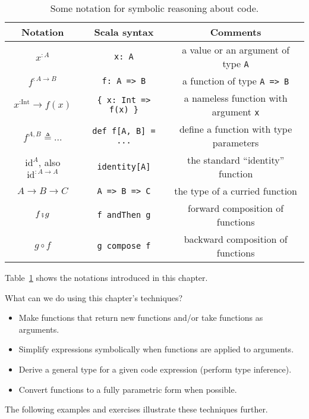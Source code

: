 \begin{table}
\begin{centering}
\begin{tabular}{|c|c|c|}
\hline 
\textbf{\small{}Notation} & \textbf{\small{}Scala syntax} & \textbf{\small{}Comments}\tabularnewline
\hline 
\hline 
{\small{}$x^{:A}$} & {\small{}}\lstinline!x: A! & {\small{}a value or an argument of type }\lstinline!A!\tabularnewline
\hline 
{\small{}$f^{:A\rightarrow B}$} & {\small{}}\lstinline!f: A => B! & {\small{}a function of type }\lstinline!A => B!\tabularnewline
\hline 
{\small{}$x^{:\text{Int}}\rightarrow f(x)$} & {\small{}}\lstinline!{ x: Int => f(x) }! & {\small{}a nameless function with argument }\lstinline!x!\tabularnewline
\hline 
{\small{}$f^{A,B}\triangleq...$} & {\small{}}\lstinline!def f[A, B] = ...! & {\small{}define a function with type parameters}\tabularnewline
\hline 
{\small{}$\text{id}^{A}$, also $\text{id}^{:A\rightarrow A}$} & {\small{}}\lstinline!identity[A]! & {\small{}the standard \textsf{``}identity\textsf{''} function}\tabularnewline
\hline 
{\small{}$A\rightarrow B\rightarrow C$} & {\small{}}\lstinline!A => B => C! & {\small{}the type of a curried function}\tabularnewline
\hline 
{\small{}$f\bef g$} & {\small{}}\lstinline!f andThen g! & {\small{}forward composition of functions}\tabularnewline
\hline 
{\small{}$g\circ f$} & {\small{}}\lstinline!g compose f! & {\small{}backward composition of functions}\tabularnewline
\hline 
\end{tabular}
\par\end{centering}
\caption{Some notation for symbolic reasoning about code.\label{tab:Mathematical-notation-for-code}}
\end{table}
Table~\ref{tab:Mathematical-notation-for-code} shows the notations
introduced in this chapter. 

What can we do using this chapter\textsf{'}s techniques?
\begin{itemize}
\item Make functions that return new functions and/or take functions as
arguments.
\item Simplify expressions symbolically when functions are applied to arguments.
\item Derive a general type for a given code expression (perform type inference).
\item Convert functions to a fully parametric form when possible.
\end{itemize}
The following examples and exercises illustrate these techniques further.

